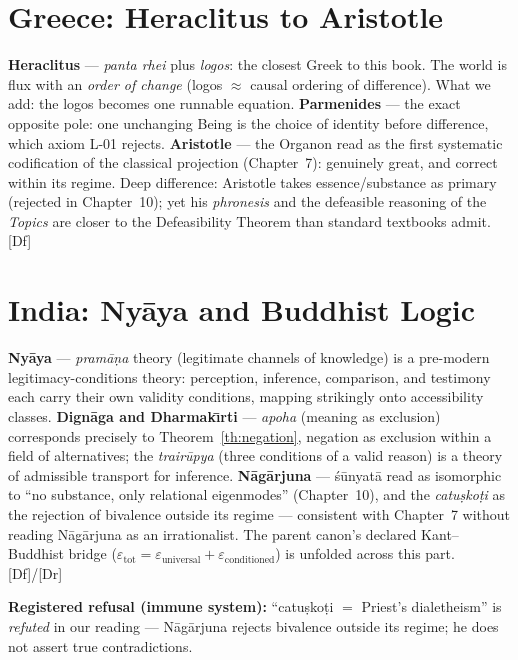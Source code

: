 \documentclass[11pt,a4paper,twoside]{book}
\newcommand{\tier}[1]{\textnormal{\small\textsf{[#1]}}}
\newcommand{\Dr}{\tier{Dr}}\newcommand{\Cj}{\tier{Cj}}\newcommand{\Wf}{\tier{Wf}}
\newcommand{\Df}{\tier{Df}}\newcommand{\OpenT}{\tier{Open}}
\theoremstyle{plain}
\theoremstyle{definition}
\theoremstyle{remark}
\begin{document}
\chapter{Greece: Heraclitus to Aristotle}

\textbf{Heraclitus} --- \emph{panta rhei} plus \emph{logos}: the closest
Greek to this book. The world is flux with an \emph{order of change}
(logos $\approx$ causal ordering of difference). What we add: the logos
becomes one runnable equation. \textbf{Parmenides} --- the exact opposite
pole: one unchanging Being is the choice of identity before difference,
which axiom L-01 rejects. \textbf{Aristotle} --- the Organon read as the
first systematic codification of the classical projection (Chapter~7):
genuinely great, and correct within its regime. Deep difference: Aristotle
takes essence/substance as primary (rejected in Chapter~10); yet his
\emph{phronesis} and the defeasible reasoning of the \emph{Topics} are closer
to the Defeasibility Theorem than standard textbooks admit. \Df

\chapter{India: Ny\=aya and Buddhist Logic}

\textbf{Ny\=aya} --- \emph{pram\=a\d{n}a} theory (legitimate channels of
knowledge) is a pre-modern legitimacy-conditions theory: perception,
inference, comparison, and testimony each carry their own validity
conditions, mapping strikingly onto accessibility classes. \textbf{Dign\=aga
and Dharmak\={\i}rti} --- \emph{apoha} (meaning as exclusion) corresponds
precisely to Theorem~\ref{th:negation}, negation as exclusion within a field
of alternatives; the \emph{trair\=upya} (three conditions of a valid reason)
is a theory of admissible transport for inference. \textbf{N\=ag\=arjuna} ---
\'s\=unyat\=a read as isomorphic to ``no substance, only relational
eigenmodes'' (Chapter~10), and the \emph{catu\d{s}ko\d{t}i} as the rejection
of bivalence outside its regime --- consistent with Chapter~7 without reading
N\=ag\=arjuna as an irrationalist. The parent canon's declared Kant--Buddhist
bridge ($\varepsilon_{\mathrm{tot}} = \varepsilon_{\mathrm{universal}} +
\varepsilon_{\mathrm{conditioned}}$) is unfolded across this part. \Df/\Dr

\textbf{Registered refusal (immune system):} ``catu\d{s}ko\d{t}i $=$
Priest's dialetheism'' is \emph{refuted} in our reading --- N\=ag\=arjuna
rejects bivalence outside its regime; he does not assert true contradictions.
\end{document}
